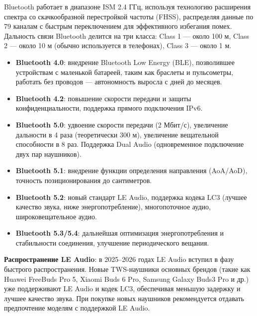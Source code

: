 
Bluetooth работает в диапазоне ISM 2.4 ГГц, используя технологию расширения спектра со скачкообразной перестройкой частоты (FHSS), распределяя данные по 79 каналам с быстрым переключением для эффективного избегания помех. Дальность связи Bluetooth делится на три класса: Class 1 — около 100 м, Class 2 — около 10 м (обычно используется в телефонах), Class 3 — около 1 м.


\begin{itemize}
  \item \textbf{Bluetooth 4.0}: внедрение Bluetooth Low Energy (BLE), позволившее устройствам с маленькой батареей, таким как браслеты и пульсометры, работать без проводов — автономность выросла с дней до месяцев.
  \item \textbf{Bluetooth 4.2}: повышение скорости передачи и защиты конфиденциальности, поддержка прямого подключения IPv6.
  \item \textbf{Bluetooth 5.0}: удвоение скорости передачи (2 Мбит/с), увеличение дальности в 4 раза (теоретически 300 м), увеличение вещательной способности в 8 раз. Поддержка Dual Audio (одновременное подключение двух пар наушников).
  \item \textbf{Bluetooth 5.1}: внедрение функции определения направления (AoA/AoD), точность позиционирования до сантиметров.
  \item \textbf{Bluetooth 5.2}: новый стандарт LE Audio, поддержка кодека LC3 (лучшее качество звука, ниже энергопотребление), многопоточное аудио, широковещательное аудио.
  \item \textbf{Bluetooth 5.3/5.4}: дальнейшая оптимизация энергопотребления и стабильности соединения, улучшение периодического вещания.
\end{itemize}

\textbf{Распространение LE Audio}: в 2025–2026 годах LE Audio вступил в фазу быстрого распространения. Новые TWS-наушники основных брендов (такие как Huawei FreeBuds Pro 5, Xiaomi Buds 6 Pro, Samsung Galaxy Buds3 Pro и др.) уже поддерживают LE Audio и кодек LC3, обеспечивая меньшую задержку и лучшее качество звука. При покупке новых наушников рекомендуется отдавать предпочтение моделям с поддержкой LE Audio.


